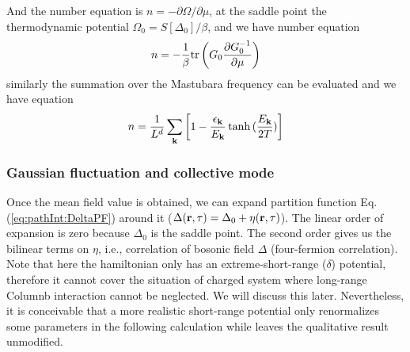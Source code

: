 And the number equation is $n=-\partial\Omega/\partial\mu$, at the saddle point the thermodynamic potential $\Omega_{0}=S[\Delta_{0}]/\beta$, and we have number equation
\begin{equation*}
n=-\frac{1}{\beta}\text{tr}\left({G_{0}\frac{\partial{G_{0}^{-1}}}{\partial{\mu}}}\right)
\end{equation*}
similarly the summation over the Mastubara frequency can be evaluated and we have equation
\begin{equation}
n=\frac{1}{L^{d}}\sum_{\mathbf{k}}\left[1-\frac{\epsilon_{\mathbf{k}}}{E_{\mathbf{k}}}\tanh{(\frac{E_{\ensuremath{\mathbf{k}}}}{2T})}\right]
\end{equation}

\subsubsection{Gaussian fluctuation and collective mode}\label{sec:collective1}
Once the mean field value is obtained, we can expand partition function Eq. (\ref{eq:pathInt:DeltaPF}) around it ($\Delta(\mathbf{r},\tau)=\Delta_{0}+\eta(\mathbf{r},\tau)$). The linear order of  expansion is zero because $\Delta_{0}$ is the saddle point.  The second order gives us the bilinear terms on $\eta$, i.e., correlation of bosonic field $\Delta$ (four-fermion correlation).  Note that here the hamiltonian only has an extreme-short-range ($\delta$) potential, therefore it cannot cover the situation of charged system where long-range Columnb interaction cannot be neglected.  We will discuss this later.  Nevertheless, it is conceivable that a more realistic short-range potential only renormalizes some parameters in the following calculation while leaves the qualitative result unmodified.  

